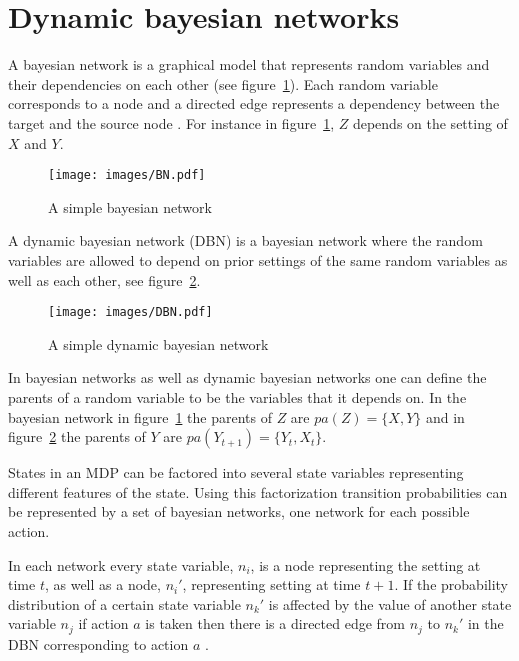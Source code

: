 \section{Dynamic bayesian networks}
\label{sec:dbn}

A bayesian network is a graphical model that represents random variables and
their dependencies on each other (see figure~\ref{fig:bn}). Each random variable
corresponds to a node and a directed edge represents a dependency between the
target and the source node \parencite{heckerman1998tutorial}. For instance in
figure~\ref{fig:bn}, $Z$ depends on the setting of $X$ and $Y$. 

\begin{figure}[H]
\centering
\texttt{[image: images/BN.pdf]}
\caption{A simple bayesian network}
\label{fig:bn}
\end{figure}

A dynamic bayesian network (DBN) is a bayesian network where the random
variables are allowed to depend on prior settings of the same random variables
as well as each other, see figure~\ref{fig:dbn}.

\begin{figure}[H]
    \centering
    \texttt{[image: images/DBN.pdf]}
    \caption{A simple dynamic bayesian network}
    \label{fig:dbn}
\end{figure}

In bayesian networks as well as dynamic bayesian networks one can define the
parents of a random variable to be the variables that it depends on. In the
bayesian network in figure~\ref{fig:bn} the parents of $Z$ are $pa(Z) = \{X,
Y\}$ and in figure~\ref{fig:dbn} the parents of $Y$ are $pa(Y_{t+1}) = \{Y_t,
X_t\}$.

States in an MDP can be factored into several state variables representing
different features of the state. Using this factorization transition
probabilities can be represented by a set of bayesian networks, one network for
each possible action. 

In each network every state variable, $n_i$, is a node representing the setting
at time $t$, as well as a node, $n_i'$, representing setting at time $t+1$. If
the probability distribution of a certain state variable $n_k'$ is affected by
the value of another state variable $n_j$ if action $a$ is taken then there is
a directed edge from $n_j$ to $n_k'$ in the DBN corresponding to action $a$
\parencite{guestrin2003efficient}.
